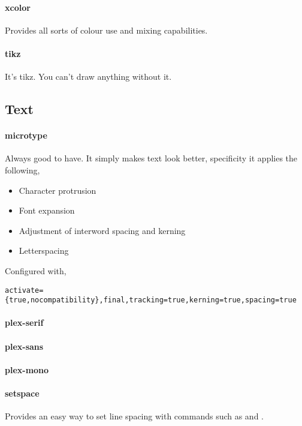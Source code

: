 \documentclass[solid,math,chem,code,plot]{bmc}
\begin{document}
\paragraph{\ttfamily xcolor}\label{par:xcolor}
Provides all sorts of colour use and mixing capabilities.
\paragraph{\ttfamily tikz}\label{par:tikz}
It's tikz. You can't draw anything without it.

\subsection{Text}

\paragraph{\ttfamily microtype}\label{par:microtype}
Always good to have. It simply makes text look better, specificity it applies the following,
\begin{itemize}
    \item Character protrusion
    \item Font expansion
    \item Adjustment of interword spacing and kerning
    \item Letterspacing
\end{itemize}
Configured with,
\begin{verbatim}
activate={true,nocompatibility},final,tracking=true,kerning=true,spacing=true
\end{verbatim}
\paragraph{\ttfamily plex-serif}\label{par:plex-serif}
\paragraph{\ttfamily plex-sans}\label{par:plex-sans}
\paragraph{\ttfamily plex-mono}\label{par:plex-mono}
\paragraph{\ttfamily setspace}\label{par:setspace}
Provides an easy way to set line spacing with commands such as
\texttt{\doublespacing} and \texttt{}.
\end{document}
